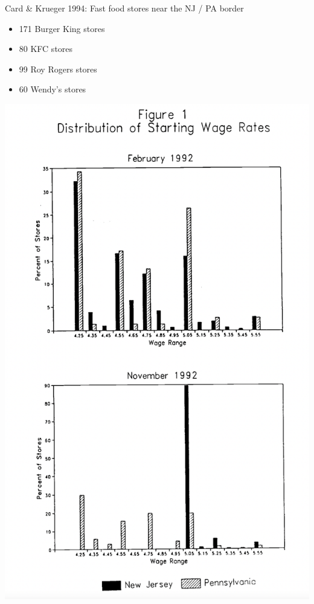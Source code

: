 \documentclass{beamer}
\begin{document}
\begin{frame}

Card \& Krueger 1994: Fast food stores near the NJ / PA border
\begin{itemize}
\item  171 Burger King stores
\item 80 KFC stores
\item 99 Roy Rogers stores
\item 60 Wendy's stores
\end{itemize}

\end{frame}

\begin{frame}
\centering
\includegraphics[height = \textheight]{figures/ck_fig1}
\end{frame}
\end{document}
